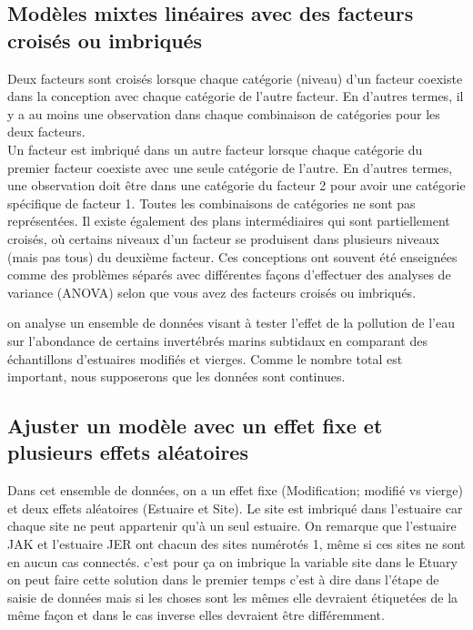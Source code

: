 \documentclass[10pt,a4paper,]{report}
\begin{document}
\begin{spacing}{1}
\chapter{Modèles mixtes linéaires avec des facteurs croisés ou imbriqués }
Deux facteurs sont croisés lorsque chaque catégorie (niveau) d'un facteur coexiste dans la conception avec chaque catégorie de l'autre facteur. En d'autres termes, il y a au moins une observation dans chaque combinaison de catégories pour les deux facteurs.\\
Un facteur est imbriqué dans un autre facteur lorsque chaque catégorie du premier facteur coexiste avec une seule catégorie de l'autre. En d'autres termes, une observation doit être dans une catégorie du facteur 2 pour avoir une catégorie spécifique de facteur 1. Toutes les combinaisons de catégories ne sont pas représentées. Il existe également des plans intermédiaires qui sont partiellement croisés, où certains niveaux d'un facteur se produisent dans plusieurs niveaux (mais pas tous) du deuxième facteur. Ces conceptions ont souvent été enseignées comme des problèmes séparés avec différentes façons d'effectuer des analyses de variance (ANOVA) selon que vous avez des facteurs croisés ou imbriqués.

on analyse un ensemble de données visant à tester l'effet de la pollution de l'eau sur l'abondance de certains invertébrés marins subtidaux en comparant des échantillons d'estuaires modifiés et vierges. Comme le nombre total est important, nous supposerons que les données sont continues.
\section{Ajuster un modèle avec un effet fixe et plusieurs effets aléatoires}
Dans cet ensemble de données, on a un effet fixe (Modification; modifié vs vierge) et deux effets aléatoires (Estuaire et Site). Le site est imbriqué dans l'estuaire car chaque site ne peut appartenir qu'à un seul estuaire. On remarque que l'estuaire JAK et l'estuaire JER ont chacun des sites numérotés 1, même si ces sites ne sont en aucun cas connectés. c'est pour ça on imbrique la variable site dans le Etuary on peut faire cette solution dans le premier temps c'est à dire dans l'étape de saisie de données mais si les choses sont les mêmes elle devraient étiquetées de la même façon et dans le cas inverse elles devraient être différemment.

\end{spacing}
\end{document}
